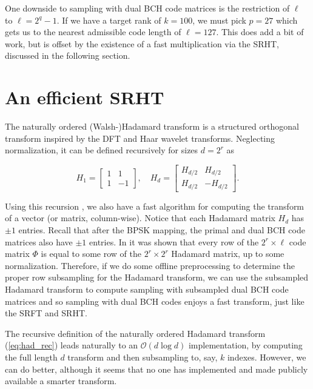 \documentclass[12pt]{article}
\begin{document}
One downside to sampling with dual BCH code matrices is the restriction of $\ell$ to $\ell=2^q-1$.  If we have a target rank of $k=100$, we must pick $p=27$ which gets us to the nearest admissible code length of $\ell=127$.  This does add a bit of work, but is offset by the existence of a fast multiplication via the SRHT, discussed in the following section.


\section{An efficient SRHT}
The naturally ordered (Walsh-)Hadamard transform is a structured orthogonal transform inspired by the DFT and Haar wavelet transforms.  Neglecting normalization, it can be defined recursively for sizes $d=2^r$ as

\begin{equation}
\label{eq:had_rec}
H_1 = \begin{bmatrix}1 & 1\\1 & -1\end{bmatrix}, \quad H_d = \begin{bmatrix}H_{d/2}&H_{d/2}\\H_{d/2}&-H_{d/2}\end{bmatrix}.
\end{equation}

   \noindent Using this recursion \cite{ailon2009fast}, we also have a fast algorithm for computing the transform of a vector (or matrix, column-wise).  Notice that each Hadamard matrix $H_d$ has $\pm 1$ entries.  Recall that after the BPSK mapping, the primal and dual BCH code matrices also have $\pm 1$ entries.  In \cite{ailon2009fast} it was shown that every row of the $2^r\times \ell$ code matrix $\Phi$ is equal to some row of the $2^r\times 2^r$ Hadamard matrix, up to some normalization.  Therefore, if we do some offline preprocessing to determine the proper row subsampling for the Hadamard transform, we can use the subsampled Hadamard transform to compute sampling with subsampled dual BCH code matrices and so sampling with dual BCH codes enjoys a fast transform, just like the SRFT and SRHT.

   The recursive definition of the naturally ordered Hadamard transform (\ref{eq:had_rec}) leads naturally to an $\mathcal{O}(d\log d)$ implementation, by computing the full length $d$ transform and then subsampling to, say, $k$ indexes.  However, we can do better, although it seems that no one has implemented and made publicly available a smarter transform.
   
\end{document}
